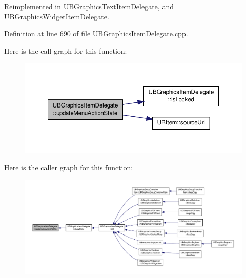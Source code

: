 Reimplemented in \hyperlink{class_u_b_graphics_text_item_delegate_a63f892bf8e8b39d2f8449b0ee45f6ca4}{U\-B\-Graphics\-Text\-Item\-Delegate}, and \hyperlink{class_u_b_graphics_widget_item_delegate_a9fc042cdc18946127bdcd651740bcd5b}{U\-B\-Graphics\-Widget\-Item\-Delegate}.



Definition at line 690 of file U\-B\-Graphics\-Item\-Delegate.\-cpp.



Here is the call graph for this function\-:
\nopagebreak
\begin{figure}[H]
\begin{center}
\leavevmode
\includegraphics[width=350pt]{dd/dd5/class_u_b_graphics_item_delegate_aaac5b391602a6c42ad371a3addf84662_cgraph}
\end{center}
\end{figure}




Here is the caller graph for this function\-:
\nopagebreak
\begin{figure}[H]
\begin{center}
\leavevmode
\includegraphics[width=350pt]{dd/dd5/class_u_b_graphics_item_delegate_aaac5b391602a6c42ad371a3addf84662_icgraph}
\end{center}
\end{figure}


